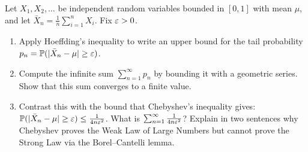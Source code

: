 \begin{exercise}
\label{ch19:ex-summability}
Let $X_1, X_2, \dots$ be independent random variables bounded in $[0,1]$ with
mean $\mu$, and let $\bar X_n = \frac1n \sum_{i=1}^n X_i$. Fix $\varepsilon > 0$.
\begin{enumerate}[label=(\alph*)]
  \item Apply Hoeffding's inequality to write an upper bound for the tail
        probability $p_n = \operatorname{\mathbb{P}}(\lvert\bar X_n - \mu\rvert \ge \varepsilon)$.
  \item Compute the infinite sum $\sum_{n=1}^\infty p_n$ by bounding it with
        a geometric series. Show that this sum converges to a finite value.
  \item Contrast this with the bound that Chebyshev's inequality gives:
        $\operatorname{\mathbb{P}}(\lvert\bar X_n - \mu\rvert \ge \varepsilon) \le \frac{1}{4n\varepsilon^2}$. What is
        $\sum_{n=1}^\infty \frac{1}{4n\varepsilon^2}$? Explain in two sentences why
        Chebyshev proves the Weak Law of Large Numbers but cannot prove the
        Strong Law via the Borel--Cantelli lemma.
\end{enumerate}
\end{exercise}
